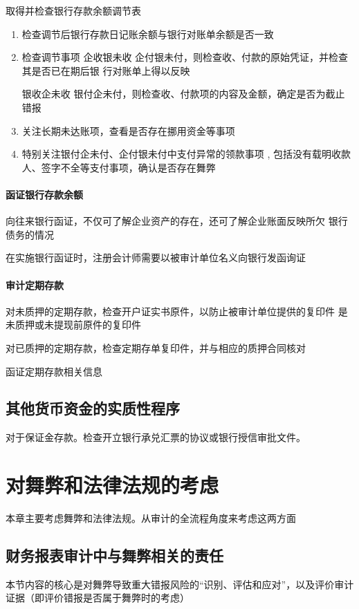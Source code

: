 \documentclass[UTF8,12pt]{ctexart}
\numberwithin{equation}{section} %
\numberwithin{figure}{section}
\numberwithin{table}{section}
\begin{document}
	取得并检查银行存款余额调节表
	\begin{enumerate}
		\item 检查调节后银行存款日记账余额与银行对账单余额是否一致
		
		\item 检查调节事项
		企收银未收 企付银未付，则检查收、付款的原始凭证，并检查其是否已在期后银 行对账单上得以反映
		
		银收企未收 银付企未付，则检查收、付款项的内容及金额，确定是否为截止错报
		
		\item 关注长期未达账项，查看是否存在挪用资金等事项 
		
		\item 特别关注银付企未付、企付银未付中支付异常的领款事项 , 包括没有载明收款 人、签字不全等支付事项，确认是否存在舞弊
	\end{enumerate}
	
	\paragraph{函证银行存款余额}
	向往来银行函证，不仅可了解企业资产的存在，还可了解企业账面反映所欠 银行债务的情况 
	
	在实施银行函证时，注册会计师需要以被审计单位名义向银行发函询证
	
	\paragraph{审计定期存款}
	对未质押的定期存款，检查开户证实书原件，以防止被审计单位提供的复印件 是未质押或未提现前原件的复印件 
	
	对已质押的定期存款，检查定期存单复印件，并与相应的质押合同核对 
	
	函证定期存款相关信息
	
	\subsection{其他货币资金的实质性程序}
	对于保证金存款。检查开立银行承兑汇票的协议或银行授信审批文件。
	
	\newpage
	\section{对舞弊和法律法规的考虑}
	本章主要考虑舞弊和法律法规。从审计的全流程角度来考虑这两方面
	
	\subsection{财务报表审计中与舞弊相关的责任}
	本节内容的核心是对舞弊导致重大错报风险的“识别、评估和应对”，以及评价审计证据（即评价错报是否属于舞弊时的考虑）
	
\end{document}
